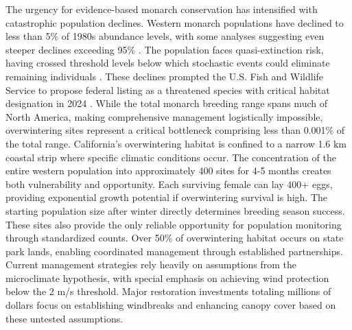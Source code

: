 The urgency for evidence-based monarch conservation has intensified with catastrophic population declines. Western monarch populations have declined to less than 5\% of 1980s abundance levels, with some analyses suggesting even steeper declines exceeding 95\% \citep{peltonWesternMonarchPopulation2019}. The population faces quasi-extinction risk, having crossed threshold levels below which stochastic events could eliminate remaining individuals \citep{schultzCitizenScienceMonitoring2017}. These declines prompted the U.S. Fish and Wildlife Service to propose federal listing as a threatened species with critical habitat designation in 2024 \citep{u.s.fishandwildlifeserviceEndangeredThreatenedWildlife2024}. While the total monarch breeding range spans much of North America, making comprehensive management logistically impossible, overwintering sites represent a critical bottleneck comprising less than 0.001\% of the total range. California's overwintering habitat is confined to a narrow 1.6 km coastal strip where specific climatic conditions occur. The concentration of the entire western population into approximately 400 sites for 4-5 months creates both vulnerability and opportunity. Each surviving female can lay 400+ eggs, providing exponential growth potential if overwintering survival is high. The starting population size after winter directly determines breeding season success. These sites also provide the only reliable opportunity for population monitoring through standardized counts. Over 50\% of overwintering habitat occurs on state park lands, enabling coordinated management through established partnerships. Current management strategies rely heavily on assumptions from the microclimate hypothesis, with special emphasis on achieving wind protection below the 2 m/s threshold. Major restoration investments totaling millions of dollars focus on establishing windbreaks and enhancing canopy cover based on these untested assumptions.


